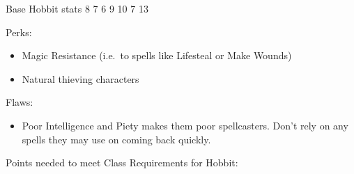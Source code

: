 \documentclass[12pt]{article}
\providecommand{\tightlist}{%
  \setlength{\itemsep}{0pt}\setlength{\parskip}{0pt}}
\begin{document}
Base Hobbit stats 8 7 6 9 10 7 13

Perks:

\begin{itemize}
\tightlist
\item
  Magic Resistance (i.e.~to spells like Lifesteal or Make Wounds)
\item
  Natural thieving characters
\end{itemize}

Flaws:

\begin{itemize}
\tightlist
\item
  Poor Intelligence and Piety makes them poor spellcasters. Don't rely
  on any spells they may use on coming back quickly.
\end{itemize}

Points needed to meet Class Requirements for Hobbit:
\end{document}
